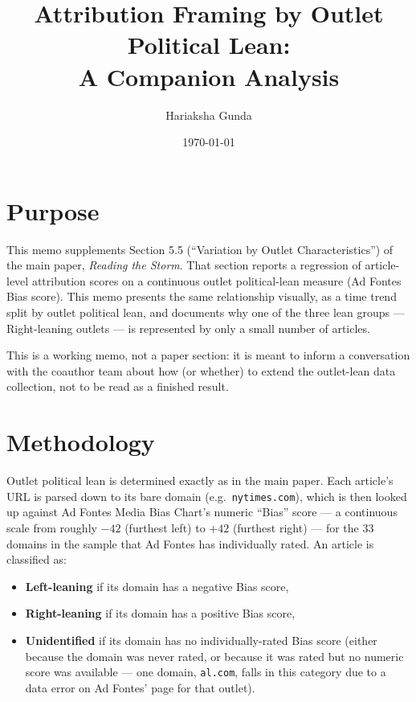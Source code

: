 \documentclass[12pt]{article}
\title{Attribution Framing by Outlet Political Lean: \\ A Companion Analysis}
\author{Hariaksha Gunda}
\date{\today}
\begin{document}
\maketitle

\section*{Purpose}

This memo supplements Section 5.5 (``Variation by Outlet
Characteristics'') of the main paper, \emph{Reading the Storm}. That
section reports a regression of article-level attribution scores on a
continuous outlet political-lean measure (Ad Fontes Bias score). This
memo presents the same relationship visually, as a time trend split by
outlet political lean, and documents why one of the three lean groups
--- Right-leaning outlets --- is represented by only a small number of
articles.

This is a working memo, not a paper section: it is meant to inform a
conversation with the coauthor team about how (or whether) to extend
the outlet-lean data collection, not to be read as a finished result.

\section*{Methodology}

Outlet political lean is determined exactly as in the main paper.
Each article's URL is parsed down to its bare domain (e.g.\
\texttt{nytimes.com}), which is then looked up against Ad Fontes
Media Bias Chart's numeric ``Bias'' score --- a continuous scale from
roughly $-42$ (furthest left) to $+42$ (furthest right) --- for the 33
domains in the sample that Ad Fontes has individually rated. An
article is classified as:

\begin{itemize}
  \item \textbf{Left-leaning} if its domain has a negative Bias score,
  \item \textbf{Right-leaning} if its domain has a positive Bias
    score,
  \item \textbf{Unidentified} if its domain has no individually-rated
    Bias score (either because the domain was never rated, or because
    it was rated but no numeric score was available --- one domain,
    \texttt{al.com}, falls in this category due to a data error on
    Ad Fontes' page for that outlet).
\end{itemize}
\end{document}
